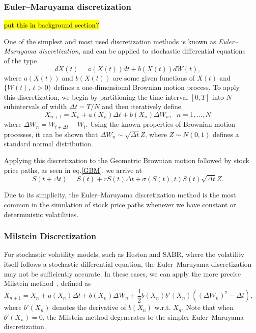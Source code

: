 \subsubsection{Euler–Maruyama discretization}
\hl{put this in background section?}

One of the simplest and most used discretization methods is known as \emph{Euler–Maruyama discretization}, and can be applied to stochastic differential equations of the type
\begin{equation}\label{SDE}
dX(t)=a(X(t))dt+b(X(t))dW(t),
\end{equation}
\noindent where $a(X(t))$ and $b(X(t))$ are some given functions of $X(t)$ and $\{W(t),\ t>0\}$ defines a one-dimensional Brownian motion process.
To apply this discretization, we begin by partitioning the time interval $[0,T]$ into $N$ subintervals of width $\Delta t=T/N$ and then iteratively define
\begin{equation}
X_{n+1}=X_n+a(X_n)\Delta t+b(X_n)\Delta W_n,\ \ \ n=1,\ldots,N
\end{equation}
\noindent where $\Delta W_n=W_{t+\Delta t}-W_{t}$.
Using the known properties of Brownian motion processes, it can be shown that $\Delta W_n\sim \sqrt{\Delta t}Z$, where $Z\sim N(0,1)$ defines a standard normal distribution.

Applying this discretization to the Geometric Brownian motion followed by stock price paths, as seen in eq.\eqref{GBM}, we arrive at
\begin{equation}
S(t+\Delta t)=S(t)+rS(t)\Delta t+\sigma(S(t),t)S(t)\sqrt{\Delta t}Z.
\end{equation}

Due to its simplicity, the Euler–Maruyama discretization method is the most common in the simulation of stock price paths whenever we have constant or deterministic volatilities.


\subsubsection{Milstein Discretization}
For stochastic volatility models, such as Heston and SABR, where the volatility itself follows a stochastic differential equation, the Euler–Maruyama discretization may not be sufficiently accurate. In these cases, we can apply the more precise Milstein method~\cite{Milstein}, defined as
\begin{equation}
X_{n+1}=X_n+a(X_n)\Delta t+b(X_n)\Delta W_n+\frac{1}{2}b(X_n)b'(X_n)((\Delta W_n)^2-\Delta t),
\end{equation}
\noindent where $b'(X_n)$ denotes the derivative of $b(X_n)$ w.r.t. $X_n$. Note that when $b'(X_n)=0$, the Milstein method degenerates to the simpler Euler–Maruyama discretization.

